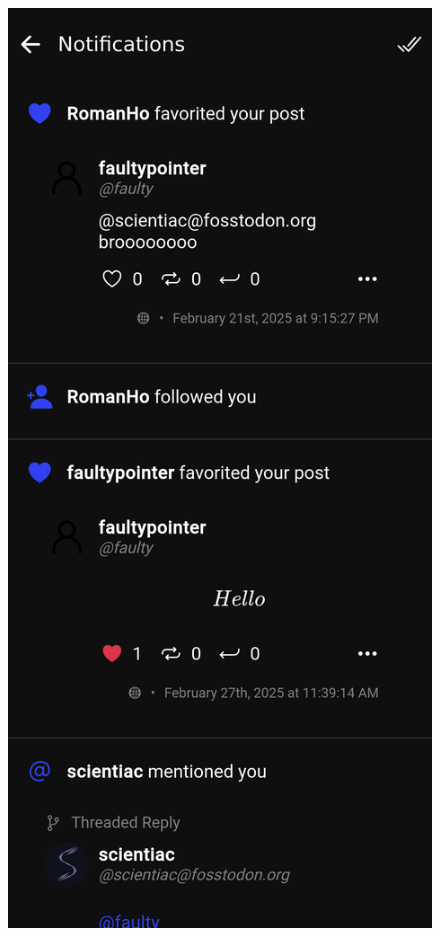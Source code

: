 \begin{figure}[htbp]
\begin{minipage}[b]{0.45\linewidth}
    \includegraphics[width=\linewidth]{Graphics/Notifications.png}

\end{minipage}
\end{figure}
